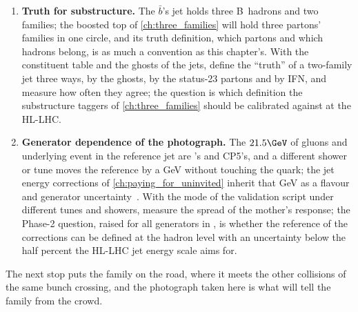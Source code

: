 \begin{enumerate}
    $0.8$ for our family and the underlying event adds a GeV per tenth
    of a unit; at the HL-LHC the pileup of \cref{ch:crowd_on_the_road}
    adds $0.6\GeV$ per unit of area per collision before subtraction.
    With the profile of the ensemble and the pileup density of
    \cref{ch:paying_for_uninvited}, find the radius at which the
    family's own radiation lost outside equals the pileup fluctuation
    inside, as a function of the jet \pt; the question, raised for Run~2
    in \cite{CMS:2016lmd} and open for Phase~2, is whether $0.4$ is still
    the right photograph for a $100\GeV$ $b$ jet at $\langle\mu\rangle=200$.
  \item \textbf{Truth for substructure.} The $\bar b$'s \akeight jet
    holds three B~hadrons and two families; the boosted top of
    \cref{ch:three_families} will hold three partons' families in one
    circle, and its truth definition, which partons and which hadrons
    belong, is as much a convention as this chapter's. With the
    constituent table and the ghosts of the \akeight jets, define the
    ``truth'' of a two-family jet three ways, by the ghosts, by the
    status-23 partons and by IFN, and measure how often they agree; the
    question is which definition the substructure taggers of
    \cref{ch:three_families} should be calibrated against at the HL-LHC.
  \item \textbf{Generator dependence of the photograph.} The $21.5\GeV$
    of gluons and underlying event in the reference jet are \PYTHIA's
    and CP5's, and a different shower or tune moves the reference by a
    GeV without touching the quark; the jet energy corrections of
    \cref{ch:paying_for_uninvited} inherit that GeV as a flavour and
    generator uncertainty~\cite{CMS:2016lmd}. With the  mode of
    the validation script under different tunes and showers, measure the
    spread of the mother's \akfournonu response; the Phase-2 question,
    raised for all generators in \cite{HSFPhysicsEventGeneratorWG:2020gxw},
    is whether the reference of the corrections can be defined at the
    hadron level with an uncertainty below the half percent the HL-LHC
    jet energy scale aims for.
\end{enumerate}
The next stop puts the family on the road, where it meets the other
collisions of the same bunch crossing, and the photograph taken here is
what will tell the family from the crowd.
